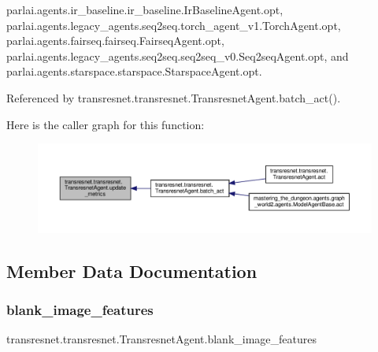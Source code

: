 parlai.\+agents.\+ir\+\_\+baseline.\+ir\+\_\+baseline.\+Ir\+Baseline\+Agent.\+opt, parlai.\+agents.\+legacy\+\_\+agents.\+seq2seq.\+torch\+\_\+agent\+\_\+v1.\+Torch\+Agent.\+opt, parlai.\+agents.\+fairseq.\+fairseq.\+Fairseq\+Agent.\+opt, parlai.\+agents.\+legacy\+\_\+agents.\+seq2seq.\+seq2seq\+\_\+v0.\+Seq2seq\+Agent.\+opt, and parlai.\+agents.\+starspace.\+starspace.\+Starspace\+Agent.\+opt.



Referenced by transresnet.\+transresnet.\+Transresnet\+Agent.\+batch\+\_\+act().

Here is the caller graph for this function\+:
\nopagebreak
\begin{figure}[H]
\begin{center}
\leavevmode
\includegraphics[width=350pt]{classtransresnet_1_1transresnet_1_1TransresnetAgent_ae061df235655fbf253702a21b0461755_icgraph}
\end{center}
\end{figure}


\subsection{Member Data Documentation}
\mbox{\label{classtransresnet_1_1transresnet_1_1TransresnetAgent_a7acce0d1ac3b941798b35062020746e9}} 
\subsubsection{\texorpdfstring{blank\+\_\+image\+\_\+features}{blank\_image\_features}}
{\footnotesize\ttfamily transresnet.\+transresnet.\+Transresnet\+Agent.\+blank\+\_\+image\+\_\+features}



